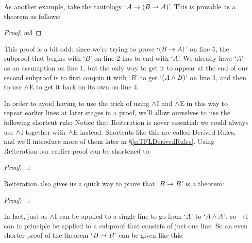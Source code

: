 As another example, take the tautology `$A \rightarrow (B \rightarrow A)$'.  This is provable as a theorem as follows:\\
\begin{proof}
\open
{}  
\open
{}  
 
 \ae{3}
\close
{} 
\close
{} 
\end{proof}
\noindent This proof is a bit odd: since we're trying to prove `$(B \rightarrow A)$' on line 5, the subproof that begins with `$B$' on line 2 has to end with `$A$'.  We already have `$A$' as an assumption on line 1, but the only way to get it to appear at the end of our second subproof is to first conjoin it with `$B$' to get `$(A \wedge B)$' on line 3, and then to use $\wedge$E to get it back on its own on line 4.

In order to avoid having to use the trick of using $\wedge$I and $\wedge$E in this way to repeat earlier lines at later stages in a proof, we'll allow ourselves to use the following shortcut rule:
Notice that Reiteration is never essential: we could always use $\wedge$I together with $\wedge$E instead.  Shortcuts like this are called Derived Rules, and we'll introduce more of them later in \S \ref{s:TFLDerivedRules}.  Using Reiteration our earlier proof can be shortened to: \\

\begin{proof}
\open
{} 
\open
{}  
 
\close
{} 
\close
{} 
\end{proof}

\noindent Reiteration also gives us a quick way to prove that `$B \rightarrow B$' is a theorem:\\

\begin{proof}
\open
{} 
 
\close
{} 
\end{proof}

In fact, just as $\wedge$I can be applied to a single line to go from `$A$' to `$A \wedge A$', so $\rightarrow$I can in principle be applied to a subproof that consists of just one line.  So an even shorter proof of  the theorem `$B \rightarrow B$' can be given like this:\\

